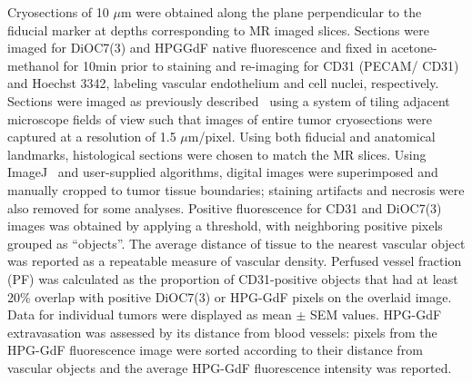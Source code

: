 Cryosections of 10 $\mu$m were obtained along the plane perpendicular to the fiducial marker at depths corresponding to MR imaged slices.
Sections were imaged for DiOC7(3) and HPGGdF native fluorescence and fixed in acetone-methanol for 10min prior to staining and re-imaging for CD31 (PECAM/ CD31) and Hoechst 3342, labeling vascular endothelium and cell nuclei, respectively.
Sections were imaged as previously described~\cite{Kyle:2007ch} using a system of tiling adjacent microscope fields of view such that images of entire tumor cryosections were captured at a resolution of 1.5 $\mu$m/pixel.
Using both fiducial and anatomical landmarks, histological sections were chosen to match the MR slices.
Using ImageJ~\cite{Collins:2007jr} and user-supplied algorithms, digital images were superimposed and manually cropped to tumor tissue boundaries; staining artifacts and necrosis were also removed for some analyses.
Positive fluorescence for CD31 and DiOC7(3) images was obtained by applying a threshold, with neighboring positive pixels grouped as ``objects''. 
The average distance of tissue to the nearest vascular object was reported as a repeatable measure of vascular density.
Perfused vessel fraction (PF) was calculated as the proportion of CD31-positive objects that had at least 20\% overlap with positive DiOC7(3) or HPG-GdF pixels on the overlaid image.
Data for individual tumors were displayed as mean $\pm$ SEM values.
HPG-GdF extravasation was assessed by its distance from blood vessels: pixels from the HPG-GdF fluorescence image were sorted according to their distance from vascular objects and the average HPG-GdF fluorescence intensity was reported.

